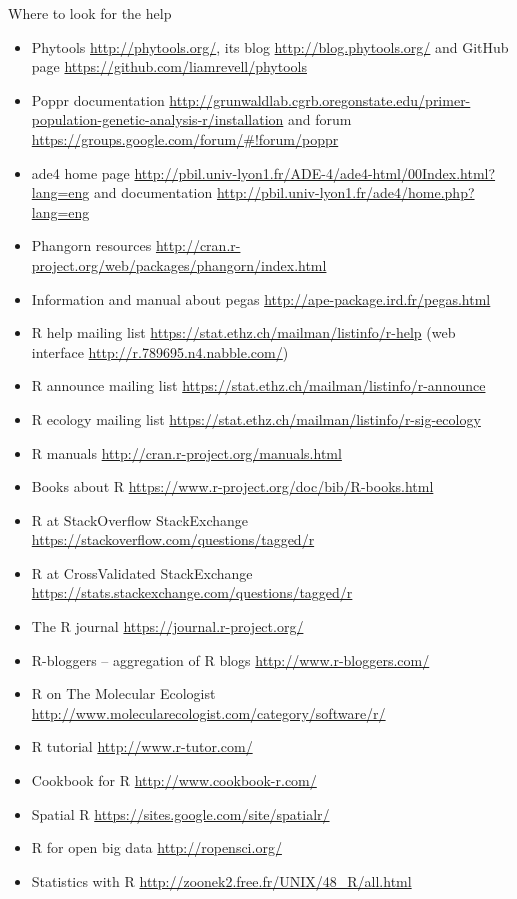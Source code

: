 \documentclass[compress, ucs, xelatex, 11pt, xcolor=svgnames,
  hyperref={
    bookmarks=true,
    unicode=true,
    colorlinks=true,
    pdftitle={Molecular data in R},
    plainpages=false,
    pdfauthor={Vojtech Zeisek},
    pdfsubject={Course about phylogeny and evolution in R},
    pdfcreator={XeLaTeX},
    pdfkeywords={R, evolution, phylogeny, molecular data},
    linkcolor=Tomato,
    anchorcolor=SaddleBrown,
    citecolor=Goldenrod,
    filecolor=DarkMagenta,
    menucolor=Sienna,
    urlcolor=DarkTurquoise,
    pdftex},
  url={hyphens, lowtilde} %
  ]{beamer}
\begin{document}
\begin{frame}[allowframebreaks]{Where to look for the help}
\begin{itemize}
 \item Phytools \url{http://phytools.org/}, its blog \url{http://blog.phytools.org/} and GitHub page \url{https://github.com/liamrevell/phytools}
 \item Poppr documentation \url{http://grunwaldlab.cgrb.oregonstate.edu/primer-population-genetic-analysis-r/installation} and forum \url{https://groups.google.com/forum/\#!forum/poppr}
 \item ade4 home page \url{http://pbil.univ-lyon1.fr/ADE-4/ade4-html/00Index.html?lang=eng} and documentation \url{http://pbil.univ-lyon1.fr/ade4/home.php?lang=eng}
 \item Phangorn resources \url{http://cran.r-project.org/web/packages/phangorn/index.html}
 \item Information and manual about pegas \url{http://ape-package.ird.fr/pegas.html}
 \item R help mailing list \url{https://stat.ethz.ch/mailman/listinfo/r-help} (web interface \url{http://r.789695.n4.nabble.com/})
 \item R announce mailing list \url{https://stat.ethz.ch/mailman/listinfo/r-announce}
 \item R ecology mailing list \url{https://stat.ethz.ch/mailman/listinfo/r-sig-ecology}
 \item R manuals \url{http://cran.r-project.org/manuals.html}
 \item Books about R \url{https://www.r-project.org/doc/bib/R-books.html}
 \item R at StackOverflow StackExchange \url{https://stackoverflow.com/questions/tagged/r}
 \item R at CrossValidated StackExchange \url{https://stats.stackexchange.com/questions/tagged/r}
 \item The R journal \url{https://journal.r-project.org/}
 \item R-bloggers -- aggregation of R blogs \url{http://www.r-bloggers.com/}
 \item R on The Molecular Ecologist \url{http://www.molecularecologist.com/category/software/r/}
 \item R tutorial \url{http://www.r-tutor.com/}
 \item Cookbook for R  \url{http://www.cookbook-r.com/}
 \item Spatial R \url{https://sites.google.com/site/spatialr/}
 \item R for open big data \url{http://ropensci.org/}
 \item Statistics with R \url{http://zoonek2.free.fr/UNIX/48_R/all.html}

\end{itemize}
\end{frame}
\end{document}
